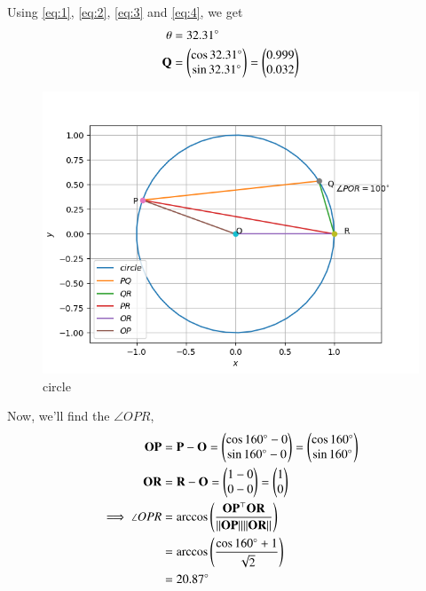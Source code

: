 \documentclass[journal,12pt,twocolumn]{IEEEtran}
\let\vec\mathbf
\begin{document}
Using \eqref{eq:1}, \eqref{eq:2}, \eqref{eq:3} and \eqref{eq:4}, we get
\begin{align}
    \theta &= 32.31\degree\\
    \vec{Q} &= \myvec{\cos32.31\degree \\ \sin32.31\degree} = \myvec{0.999 \\ 0.032}   
\end{align}

\begin{figure}[!htb]
    \centering
    \includegraphics[width=\columnwidth]{figs/circle.png}
    \caption{circle}
    \label{fig:circle}
\end{figure}

Now, we'll find the $\angle{OPR}$,
\begin{align}
    \vec{OP} &= \vec{P} - \vec{O} = \myvec{\cos160\degree - 0 \\ \sin160\degree - 0} = \myvec{\cos160\degree \\ \sin160\degree} \\
    \vec{OR} &= \vec{R} - \vec{O} = \myvec{1 - 0 \\ 0 - 0} = \myvec{1 \\ 0} \\
    \implies \angle{OPR} &= \arccos\brak{\frac{\vec{OP}^\top \vec{OR}}{\norm{\vec{OP}} \norm{\vec{OR}}}} \\
    &= \arccos\brak{\frac{\cos160\degree + 1}{\sqrt{2}}} \\
    &= 20.87\degree
\end{align}
\end{document}
